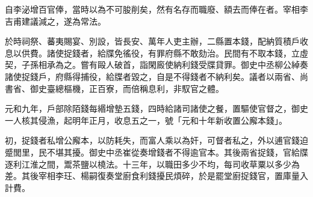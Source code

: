 \begin{pinyinscope}
 自李泌增百官俸，當時以為不可朘削矣，然有名存而職廢、額去而俸在者。宰相李吉甫建議減之，遂為常法。



 於時祠祭、蕃夷賜宴、別設，皆長安、萬年人吏主辦，二縣置本錢，配納質積戶收息以供費。諸使捉錢者，給牒免徭役，有罪府縣不敢劾治。民間有不取本錢，立虛契，子孫相承為之。嘗有毆人破首，詣閑廄使納利錢受牒貸罪。御史中丞柳公綽奏諸使捉錢戶，府縣得捕役，給牒者毀之，自是不得錢者不納利矣。議者以兩省、尚書省、御史臺總樞機，正百寮，而倍稱息利，非馭官之體。



 元和九年，戶部除陌錢每緡增墊五錢，四時給諸司諸使之餐，置驅使官督之，御史一人核其侵漁，起明年正月，收息五之一，號「元和十年新收置公廨本錢」。



 初，捉錢者私增公廨本，以防耗失，而富人乘以為奸，可督者私之，外以逋官錢迫蹙閭里，民不堪其擾。御史中丞崔從奏增錢者不得逾官本。其後兩省捉錢，官給牒逐利江淮之間，鬻茶鹽以橈法。十三年，以職田多少不均，每司收草粟以多少為差。其後宰相李玨、楊嗣復奏堂廚食利錢擾民煩碎，於是罷堂廚捉錢官，置庫量入計費。




\end{pinyinscope}
